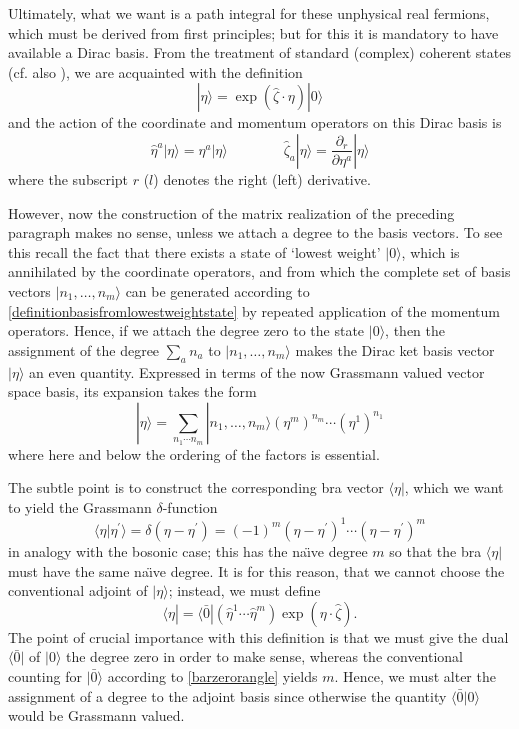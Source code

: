 \documentclass[a4paper,10pt]{article}
\begin{document}
Ultimately, what we want is a path integral for these unphysical real fermions, which 
must be derived from first principles; but for this it is mandatory to have available a 
Dirac basis. From the treatment of standard (complex) coherent states (cf. also 
\cite{Marn 87}), we are acquainted with the definition
\begin{equation}
|\eta\rangle=\exp(\hat{\zeta}\cdot\eta)|0\rangle
\end{equation}
and the action of the coordinate and momentum operators on this Dirac basis is
\begin{equation}
\hat{\eta}^a|\eta\rangle=\eta^a|\eta\rangle
\qquad\qquad\hat{\zeta}_a|\eta\rangle=\frac{\partial_r}{\partial\eta^a}|\eta\rangle
\end{equation}
where the subscript $r$ ($l$) denotes the right (left) derivative. 

However, now the construction of the matrix realization of the preceding paragraph makes 
no sense, unless we attach a degree to the basis vectors. To see this recall the fact  
that there exists a state of `lowest weight' $|0\rangle$, which is annihilated by the 
coordinate operators, and from which the complete set of basis vectors 
$|n_1,\ldots,n_m\rangle$ can be generated according to \eqref{definitionbasisfromlowestweightstate} by repeated application of the momentum operators. Hence, if we attach 
the degree zero to the state $|0\rangle$, then the assignment of the degree $\sum_an_a$ 
to $|n_1,\ldots,n_m\rangle$ makes the Dirac ket basis vector $|\eta\rangle$ an even 
quantity. Expressed in terms of the now Grassmann valued vector space basis, its 
expansion takes the form
\begin{equation}
|\eta\rangle=\sum_{n_1\cdots n_m}|n_1,\ldots,n_m\rangle(\eta^m)^{n_m}\cdots(\eta^1)^{n_1}
\end{equation}
where here and below the ordering of the factors is essential.

The subtle point is to construct the corresponding bra vector $\langle\eta|$, which we 
want to yield the Grassmann $\delta$-function 
\begin{equation}\label{langleetatimesetaprimerangle}
\langle\eta|\eta^{\prime}\rangle=\delta(\eta-\eta^{\prime})=(-1)^m(\eta-
\eta^{\prime})^1\cdots(\eta-\eta^{\prime})^m
\end{equation}
in analogy with the bosonic case; this has the na\"\i ve degree $m$ so that the bra 
$\langle\eta|$ must have the same na\"\i ve degree. It is for this reason, that we 
cannot choose the conventional adjoint of $|\eta\rangle$; instead, we must define
\begin{equation}
\langle\eta|=\langle\bar{0}|(\hat{\eta}^1\cdots\hat{\eta}^m)\exp(\eta\cdot\hat{\zeta}).
\end{equation}
The point of crucial importance with this definition is that we must give the dual 
$\langle\bar{0}|$ of $|0\rangle$ the degree zero in order to make sense, whereas the 
conventional counting for $|\bar{0}\rangle$ according to \eqref{barzerorangle} yields 
$m$. Hence, we must alter the assignment of a degree to the adjoint basis since otherwise 
the quantity $\langle\bar{0}|0\rangle$ would be Grassmann valued.
\end{document}

